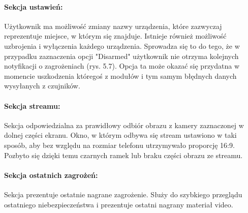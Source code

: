 \paragraph{Sekcja ustawień:}
Użytkownik ma możliwość zmiany nazwy urządzenia, które zazwyczaj reprezentuje miejsce, w którym się znajduje. Istnieje również możliwość uzbrojenia i wyłączenia każdego urządzenia. Sprowadza się to do tego, że w przypadku zaznaczenia opcji "Disarmed" użytkownik nie otrzyma kolejnych notyfikacji o zagrożeniach (rys. 5.7). Opcja ta może okazać się przydatna w momencie uszkodzenia któregoś z modułów i tym samym błędnych danych wysyłanych z czujników.
\paragraph{Sekcja streamu:}
Sekcja odpowiedzialna za prawidłowy odbiór obrazu z kamery zaznaczonej w dolnej części ekranu. Okno, w którym odbywa się stream ustawiono w taki sposób, aby bez względu na rozmiar telefonu utrzymywało proporcję 16:9. Pozbyto się dzięki temu czarnych ramek lub braku części obrazu ze streamu.
\paragraph{Sekcja ostatnich zagrożeń:}
Sekcja prezentuje ostatnie nagrane zagrożenie. Służy do szybkiego przeglądu ostatniego niebezpieczeństwa i prezentuje ostatni nagrany materiał video. 

